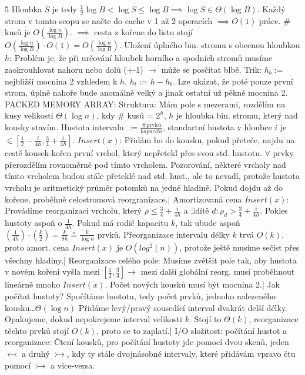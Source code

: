\documentclass[8pt]{extarticle}
\begin{document}
\begin{multicols*}{5}
 Hloubka $S$ je tedy $\frac{1}{2}\log B < \log S \le \log B \implies \log S \in \Theta(\log B)$.
 Každý strom v tomto scopu se načte do cache v 1 až 2 operacích $\implies O(1)$ práce. $\#$ kusů je $O(\frac{\log n}{\log B})$. $\implies$ cesta z kořene do listu stojí $O(\frac{\log n}{\log B}) \cdot O(1) = O(\frac{\log n}{\log B})$. Uložení úplného bin. stromu s obecnou hloubkou $h$: Problém je, že při určování hloubek horního a spodních stromů musíme zaokrouhlovat nahoru nebo dolů (+-1) $\rightarrow$ může se posčítat blbě. Trik: $h_b :=$ nejbližší mocnina 2 vzhledem k $h$, $h_t := h - h_b$. Lze ukázat, že poté pouze první strom, úplně nahoře bude anomálně velký a jinak ostatní už pěkně mocnina 2. PACKED MEMORY ARRAY: Struktura: Mám pole s mezerami, rozdělím na kusy velikosti $\Theta(\log n)$, kdy $\#$ kusů = $2^h$, $h$ je hloubka bin. stromu, který nad kousky stavím. Hustota intervalu $:= \frac{\text{\# prvků}}{kapacita}$, standartní hustota v hloubce $i$ je $\in [\frac{1}{2} - \frac{i}{4h}, \frac{3}{4} + \frac{i}{4h}]$. $Insert(x)$:  Přidám ho do kousku, pokud přeteče, najdu na cestě kousek-kořen první vrchol, který nepřetekl přes svou std. hustotu. $\forall$ prvky přerozdělím rovnoměrně pod tímto vrcholem. Pozorování, některé vrcholy nad tímto vrcholem budou stále přeteklé nad std. hust., ale to nevadí, protože hustota vrcholu je aritmetický průměr potomků na jedné hladině. Pokud dojdu až do kořene, proběhně celostromová reorgranizace.| Amortizovaná cena $Insert(x)$: Provádíme reorganizaci vrcholu, který $\rho \leq \frac{3}{4} + \frac{i}{4h}$ a $\exists$dítě $d: \rho_d > \frac34 + \frac{i}{4h}$. Pokles hustoty aspoň o $\frac1{4h}$. Pokud má rodič kapacitu $k$, tak ubude aspoň $(\frac1{4h})\cdot(\frac{k}2) = \frac{k}{8h} \circeq  \frac{k}{\log n}$ prvků. 
 Přeorganizace intervalu délky $k$ trvá $O(k)$, proto amort. cena $Insert(x)$ je $O(log^2(n))$, protože ještě musíme sečíst přes všechny hladiny.| Reorganizace celého pole: Musíme zvětšit pole tak, aby hustota v novém kořeni vyšla mezi $[\frac12, \frac34] \rightarrow$ mezi další globální reorg. musí proběhnout lineárně mnoho $Insert(x)$. Počet nových kousků musí být mocnina 2.|
 Jak počítat hustoty? Spočítáme hustotu, tedy počet prvků, jednoho nalezeného kousku\dots $\Theta(\log n)$ Přidáme levý/pravý sousedící interval dvakrát delší délky. Opakujeme, dokud nepokrejeme interval velikosti $k$. Stojí to $\Theta(k)$, reorganizace těchto prvků stojí $O(k)$, proto se to zaplatí.| I/O složitost: počítání hustot a reorganizace: Čtení kousků, pro počítání hustoty jde pomocí dvou skenů, jeden $\leftarrowtail$ a druhý $\rightarrowtail$, kdy ty stále dvojnásobné intervaly, které přidávám vpravo čtu pomocí $\rightarrowtail$ a vice-versa.

\end{multicols*}
\end{document}
